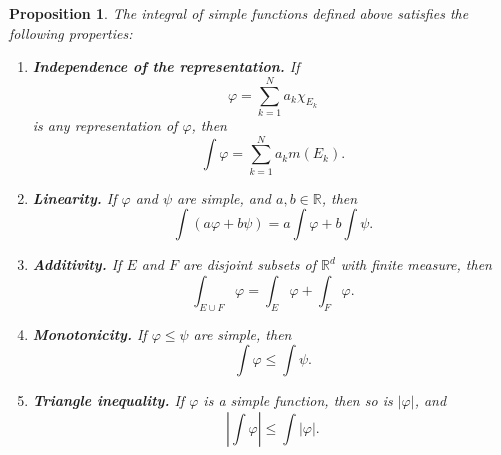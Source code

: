 \documentclass[11pt,openany]{book}
\newtheorem{proposition}[theorem]{Proposition}
\begin{document}
\begin{proposition}
The integral of simple functions defined above satisfies the following properties:
\begin{enumerate}
\item[(i)] \textbf{Independence of the representation.} If
\[
\varphi=\sum_{k=1}^{N}a_k\chi_{E_k}
\]
is any representation of $\varphi$, then
\[
\int\varphi=\sum_{k=1}^{N}a_km(E_k).
\]
\item[(ii)] \textbf{Linearity.} If $\varphi$ and $\psi$ are simple, and $a,b\in\mathbb{R}$, then
\[
\int(a\varphi+b\psi)=a\int\varphi+b\int\psi.
\]
\item[(iii)] \textbf{Additivity.} If $E$ and $F$ are disjoint subsets of $\mathbb{R}^d$ with finite measure, then
\[
\int_{E\cup F}\varphi=\int_E\varphi+\int_F\varphi.
\]
\item[(iv)] \textbf{Monotonicity.} If $\varphi\leq\psi$ are simple, then
\[
\int\varphi\leq\int\psi.
\]
\item[(v)] \textbf{Triangle inequality.} If $\varphi$ is a simple function, then so is $|\varphi|$, and
\[
\left|\int\varphi\right|\leq\int|\varphi|.
\]
\end{enumerate}
\end{proposition}
\end{document}
